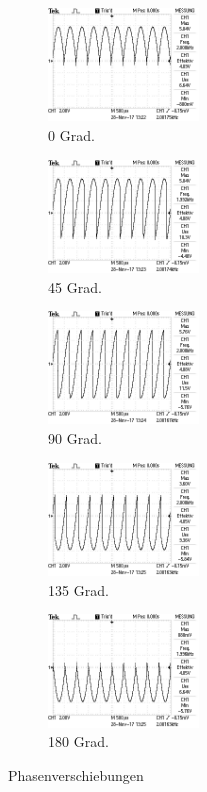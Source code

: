 \begin{figure}
  \centering
  \begin{subfigure}{0.3\textwidth}
    \centering
    \includegraphics[height=3cm]{data/Phase1.jpg}
    \caption{0 Grad.}
    \label{fig:Phase1}
  \end{subfigure}
  \begin{subfigure}{0.3\textwidth}
    \centering
    \includegraphics[height=3cm]{data/Phase2.jpg}
    \caption{45 Grad.}
    \label{fig:Phase2}
  \end{subfigure}
  \begin{subfigure}{0.3\textwidth}
    \centering
    \includegraphics[height=3cm]{data/Phase3.jpg}
    \caption{90 Grad.}
    \label{fig:Phase3}
  \end{subfigure}
  \begin{subfigure}{0.3\textwidth}
    \centering
    \includegraphics[height=3cm]{data/Phase4.jpg}
    \caption{135 Grad.}
    \label{fig:Phase4}
  \end{subfigure}
  \begin{subfigure}{0.3\textwidth}
    \centering
    \includegraphics[height=3cm]{data/Phase5.jpg}
    \caption{180 Grad.}
    \label{fig:Phase5}
  \end{subfigure}
  \caption{Phasenverschiebungen}
  \label{fig:Phasen}
\end{figure}

